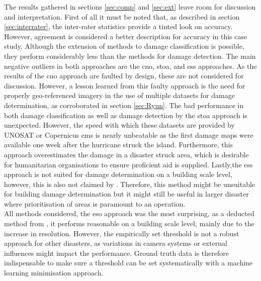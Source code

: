 \noindent The results gathered in sections \ref{sec:comp} and \ref{sec:ext} leave room for discussion and interpretation. First of all it must be noted that, as described in section \ref{sec:interrater}, the inter-rater statistics provide a tinted look on accuracy. However, agreement is considered a better description for accuracy in this case study. Although the extension of methods to damage classification is possible, they perform considerably less than the methods for damage detection. The main negative outliers in both approaches are the \ac{cno}, \ac{stoa}, and \ac{ess} approaches. As the results of the \ac{cno} approach are faulted by design, these are not considered for discussion. However, a lesson learned from this faulty approach is the need for properly geo-referenced imagery in the use of multiple datasets for damage determination, as corroborated in section \ref{sec:Ryun}. The bad performance in both damage classification as well as damage detection by the \ac{stoa} approach is unexpected. However, the speed with which these datasets are provided by UNOSAT or Copernicus \ac{ems} is nearly unbeatable as the first damage maps were available one week after the hurricane struck the island. Furthermore, this approach overestimates the damage in a disaster struck area, which is desirable for humanitarian organisations to ensure proficient aid is supplied. Lastly,the \ac{ess} approach is not suited for damage determination on a building scale level, however, this is also not claimed by \citet{Yun2015}. Therefore, this method might be unsuitable for building damage determination but it might still be useful in larger disaster where prioritisation of areas is paramount to an operation.\\

\noindent All methods considered, the \ac{eso} approach was the most surprising, as a deducted method from \citet{Yun2015}, it performs reasonable on a building scale level, mainly due to the increase in resolution. However, the empirically set threshold is not a robust approach for other disasters, as variations in camera systems or external influences might impact the performance. Ground truth data is therefore indispensable to make sure a threshold can be set systematically with a machine learning minimisation approach.\\

